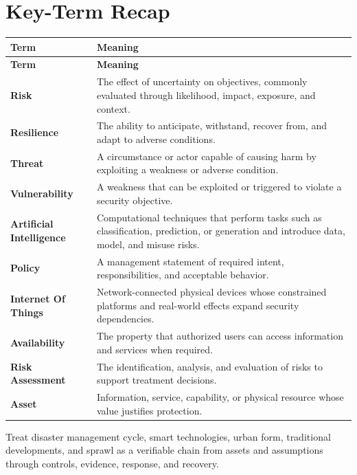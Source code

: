 \documentclass[11pt]{article}
\begin{document}
\section*{Key-Term Recap}
\begin{longtable}{>{\RaggedRight\arraybackslash}p{}>{\RaggedRight\arraybackslash}p{}}
\toprule\rowcolor{Navy}\color{white}\textbf{Term} & \color{white}\textbf{Meaning}\\\midrule
\endfirsthead
\toprule\rowcolor{Navy}\color{white}\textbf{Term} & \color{white}\textbf{Meaning}\\\midrule
\endhead
\textbf{Risk} & The effect of uncertainty on objectives, commonly evaluated through likelihood, impact, exposure, and context. \\\midrule
\textbf{Resilience} & The ability to anticipate, withstand, recover from, and adapt to adverse conditions. \\\midrule
\textbf{Threat} & A circumstance or actor capable of causing harm by exploiting a weakness or adverse condition. \\\midrule
\textbf{Vulnerability} & A weakness that can be exploited or triggered to violate a security objective. \\\midrule
\textbf{Artificial Intelligence} & Computational techniques that perform tasks such as classification, prediction, or generation and introduce data, model, and misuse risks. \\\midrule
\textbf{Policy} & A management statement of required intent, responsibilities, and acceptable behavior. \\\midrule
\textbf{Internet Of Things} & Network-connected physical devices whose constrained platforms and real-world effects expand security dependencies. \\\midrule
\textbf{Availability} & The property that authorized users can access information and services when required. \\\midrule
\textbf{Risk Assessment} & The identification, analysis, and evaluation of risks to support treatment decisions. \\\midrule
\textbf{Asset} & Information, service, capability, or physical resource whose value justifies protection. \\\midrule
\bottomrule
\end{longtable}
\begin{takeawaybox}
Treat disaster management cycle, smart technologies, urban form, traditional developments, and sprawl as a verifiable chain from assets and assumptions through controls, evidence, response, and recovery.
\end{takeawaybox}
\end{document}
